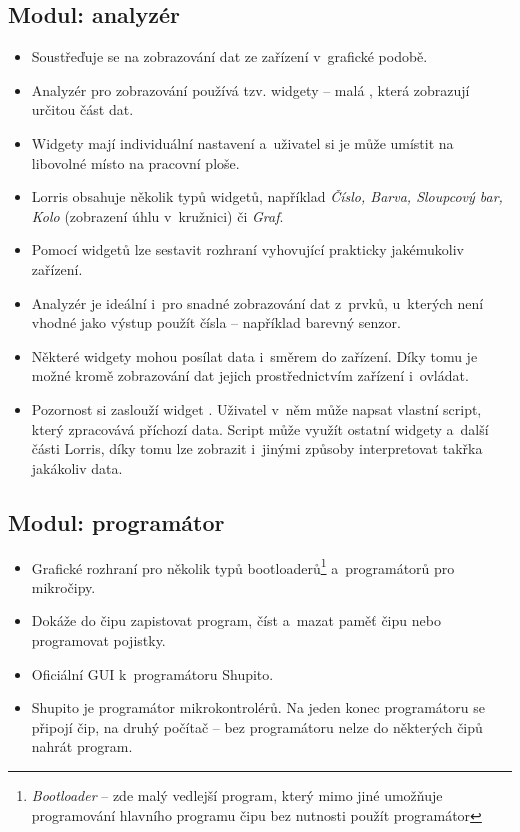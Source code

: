 \documentclass[12pt, a4paper, oneside]{article}
\newcommand{\It}{\textit}  %
\begin{document}
\subsection*{Modul: analyzér}
\begin{itemize} 
    \item Soustřeďuje se na zobrazování dat ze zařízení v~grafické podobě.
    \item Analyzér pro zobrazování používá tzv. widgety -- malá , která zobrazují určitou část dat.
    \item Widgety mají individuální nastavení a~uživatel si je může umístit na libovolné místo na pracovní ploše.
    \item Lorris obsahuje několik typů widgetů, například \It{Číslo, Barva, Sloupcový bar, Kolo} (zobrazení úhlu v~kružnici) či \It{Graf}.
    \item Pomocí widgetů lze sestavit rozhraní vyhovující prakticky jakémukoliv zařízení.
    \item Analyzér je ideální i~pro snadné zobrazování dat z~prvků, u~kterých není vhodné jako výstup použít čísla -- například barevný senzor.
    \item Některé widgety mohou posílat data i~směrem do zařízení. Díky tomu je možné kromě zobrazování dat jejich prostřednictvím zařízení i~ovládat.
    \item Pozornost si zaslouží widget . Uživatel v~něm může napsat vlastní script, který zpracovává příchozí data. Script může využít ostatní widgety a~další části Lorris, díky tomu lze zobrazit i~jinými způsoby interpretovat takřka jakákoliv data.
\end{itemize}

\subsection*{Modul: programátor}
\begin{itemize}
    \item Grafické rozhraní pro několik typů bootloaderů\footnote{\It{Bootloader} -- zde malý vedlejší program, který mimo jiné umožňuje programování hlavního programu čipu bez nutnosti použít programátor} a~programátorů pro mikročipy.
    \item Dokáže do čipu zapistovat program, číst a~mazat paměť čipu nebo programovat pojistky.
    \item Oficiální GUI k~programátoru Shupito.
    \item Shupito je programátor mikrokontrolérů. Na jeden konec programátoru se připojí čip, na druhý počítač -- bez programátoru nelze do některých čipů nahrát program.
\end{itemize}
\end{document}
